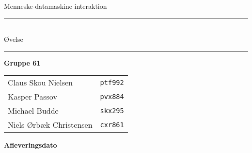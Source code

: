 \begin{titlepage}
\begin{center}

{\large Menneske-datamaskine interaktion}

\vspace{2cm}

\rule{\linewidth}{0.5mm}\\[3mm]

{\LARGE Øvelse \oevelsenr}\\[6mm]
{\Huge \oevelsetitel}

\rule{\linewidth}{0.5mm}

\vfill

{\bf Gruppe 61}\\[3mm]
\begin{tabular}{lr}
  Claus Skou Nielsen & \texttt{ptf992} \\
  Kasper Passov & \texttt{pvx884} \\
  Michael Budde & \texttt{skx295} \\
  Niels Ørbæk Christensen & \texttt{cxr861}
\end{tabular}

\vspace{1cm}

{\bf Afleveringsdato}\\[3mm]
\afleveringsdato

\vfill

\end{center}
\end{titlepage}
